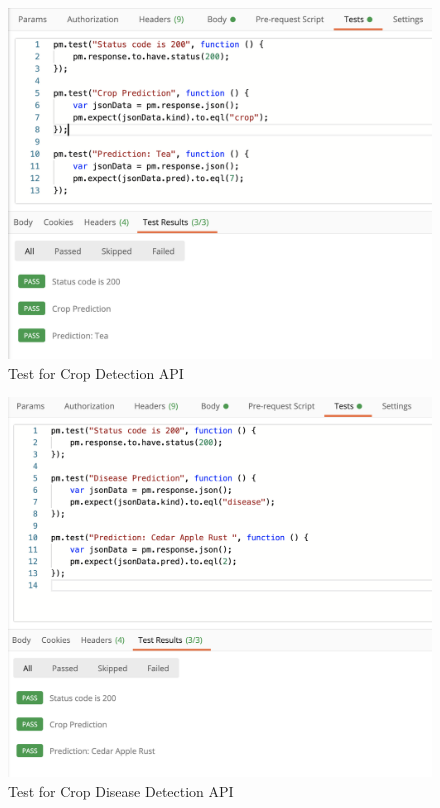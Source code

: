 \documentclass[../Report.tex]{subfiles}
\begin{document}
\begin{figure}[H]
  \centering
  \includegraphics[width=0.7\linewidth]{images/api_crop.png}
  \caption{Test for Crop Detection API}
  \label{fig:test_api_crop}
\end{figure}
\begin{figure}[H]
  \centering
  \includegraphics[width=0.7\linewidth]{images/api_disease.png}
  \caption{Test for Crop Disease Detection API}
  \label{fig:test_api_disease}
\end{figure}
\end{document}
